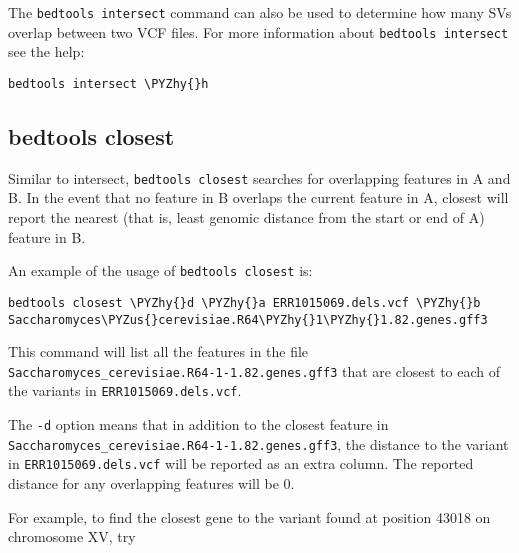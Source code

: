 \documentclass[11pt]{article}
\makeatletter
\def\PYZus{\char`\_}
\def\PYZhy{\char`\-}
\newcommand{\boxspacing}{\kern\kvtcb@left@rule\kern\kvtcb@boxsep}
\newcommand{\prompt}[4]{
        {\ttfamily\llap{{\color{blue}\LARGE\faKeyboardO\hspace{3pt}#4}}\vspace{-\baselineskip}}
    }
\makeatother
\begin{document}
    The \texttt{bedtools\ intersect} command can also be used to determine
how many SVs overlap between two VCF files. For more information about
\texttt{bedtools\ intersect} see the help:

    \begin{tcolorbox}[breakable, size=fbox, boxrule=1pt, pad at break*=1mm,colback=cellbackground, colframe=cellborder]
\prompt{In}{incolor}{ }{\boxspacing}
\begin{Verbatim}[commandchars=\\\{\}]
bedtools intersect \PYZhy{}h
\end{Verbatim}
\end{tcolorbox}

    \hypertarget{bedtools-closest}{%
\subsection{bedtools closest}\label{bedtools-closest}}

Similar to intersect, \texttt{bedtools\ closest} searches for
overlapping features in A and B. In the event that no feature in B
overlaps the current feature in A, closest will report the nearest (that
is, least genomic distance from the start or end of A) feature in B.

An example of the usage of \texttt{bedtools\ closest} is:

    \begin{tcolorbox}[breakable, size=fbox, boxrule=1pt, pad at break*=1mm,colback=cellbackground, colframe=cellborder]
\prompt{In}{incolor}{ }{\boxspacing}
\begin{Verbatim}[commandchars=\\\{\}]
bedtools closest \PYZhy{}d \PYZhy{}a ERR1015069.dels.vcf \PYZhy{}b Saccharomyces\PYZus{}cerevisiae.R64\PYZhy{}1\PYZhy{}1.82.genes.gff3
\end{Verbatim}
\end{tcolorbox}

    This command will list all the features in the file
\texttt{Saccharomyces\_cerevisiae.R64-1-1.82.genes.gff3} that are
closest to each of the variants in \texttt{ERR1015069.dels.vcf}.

The \texttt{-d} option means that in addition to the closest feature in
\texttt{Saccharomyces\_cerevisiae.R64-1-1.82.genes.gff3}, the distance
to the variant in \texttt{ERR1015069.dels.vcf} will be reported as an
extra column. The reported distance for any overlapping features will be
0.

For example, to find the closest gene to the variant found at position
43018 on chromosome XV, try
\end{document}
